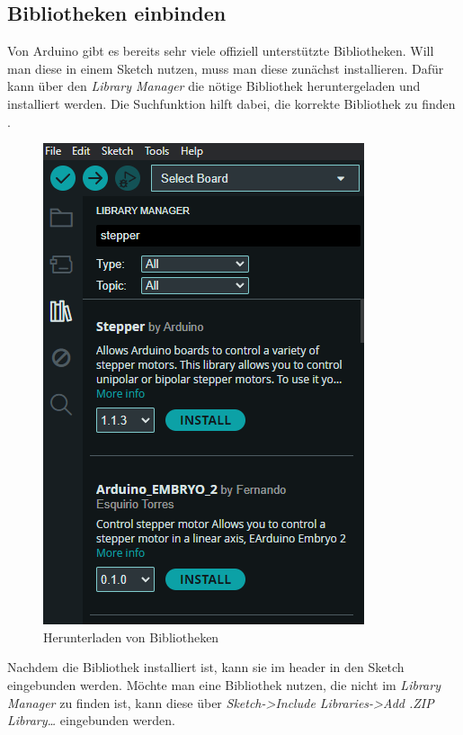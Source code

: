\subsection{Bibliotheken einbinden}
Von Arduino gibt es bereits sehr viele offiziell unterstützte Bibliotheken. Will man diese in einem Sketch nutzen, muss man diese zunächst installieren.
Dafür kann über den \textit{Library Manager} die nötige Bibliothek heruntergeladen und installiert werden. Die Suchfunktion hilft dabei, die korrekte Bibliothek zu finden \cite{Arduino.2024c}.
\begin{figure}
	\begin{center}
		\includegraphics[width=\textwidth]{General/Librarymanager}
		\caption{Herunterladen von Bibliotheken} \label{Herunterladen von Bibliotheken}
	\end{center}
\end{figure}
Nachdem die Bibliothek installiert ist, kann sie im header in den Sketch eingebunden werden.
Möchte man eine Bibliothek nutzen, die nicht im \textit{Library Manager} zu finden ist, kann diese über \textit{Sketch->Include Libraries->Add .ZIP Library…} eingebunden werden.

